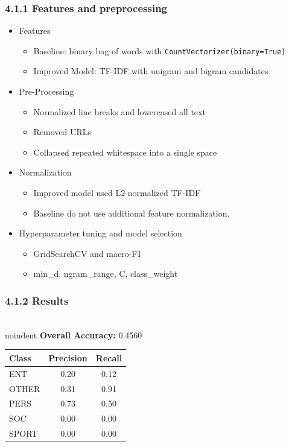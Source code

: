 \documentclass[11pt]{article}
\begin{document}
\subsubsection*{4.1.1 Features and preprocessing}
\begin{itemize}
        \item Features
                \begin{itemize}
\item Baseline: binary bag of words with \texttt{CountVectorizer(binary=True)}
\item Improved Model: TF-IDF with unigram and bigram candidates
                \end{itemize}
        \item Pre-Processing
                \begin{itemize}
                        \item Normalized line breaks and lowercased all text
\item Removed URLs
\item Collapsed repeated whitespace into a single space
                \end{itemize}
        
        \item Normalization
                \begin{itemize}
                        \item Improved model used L2-normalized TF-IDF
\item Baseline do not use additional feature normalization.
                \end{itemize}
        \item Hyperparameter tuning and model selection
                \begin{itemize}
                        \item GridSearchCV and macro-F1
                        \item min\_d, ngram\_range, C, class\_weight
                \end{itemize}
\end{itemize}


\subsubsection*{4.1.2 Results}
\\noindent \textbf{Overall Accuracy:} 0.4560

\begin{table}[h]
\centering
\begin{tabular}{lcc}
\hline
\textbf{Class} & \textbf{Precision} & \textbf{Recall} \\
\hline
ENT   & 0.20 & 0.12 \\
OTHER & 0.31 & 0.91 \\
PERS  & 0.73 & 0.50 \\
SOC   & 0.00 & 0.00 \\
SPORT & 0.00 & 0.00 \\
\hline
\end{tabular}
\end{table}
\end{document}
